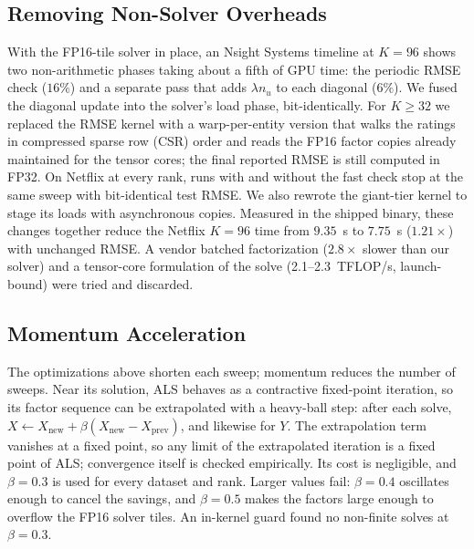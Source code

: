 \subsection{Removing Non-Solver Overheads}
\label{ssec:nonsolver}

With the FP16-tile solver in place, an Nsight Systems timeline at $K=96$ shows two non-arithmetic phases taking about a fifth of GPU time: the periodic RMSE check ($16\%$) and a separate pass that adds $\lambda n_u$ to each diagonal ($6\%$). We fused the diagonal update into the solver's load phase, bit-identically. For $K \ge 32$ we replaced the RMSE kernel with a warp-per-entity version that walks the ratings in compressed sparse row (CSR) order and reads the FP16 factor copies already maintained for the tensor cores; the final reported RMSE is still computed in FP32. On Netflix at every rank, runs with and without the fast check stop at the same sweep with bit-identical test RMSE. We also rewrote the giant-tier kernel to stage its loads with asynchronous copies. Measured in the shipped binary, these changes together reduce the Netflix $K=96$ time from $9.35$~s to $7.75$~s ($1.21\times$) with unchanged RMSE. A vendor batched factorization ($2.8\times$ slower than our solver) and a tensor-core formulation of the solve (2.1--2.3~TFLOP/s, launch-bound) were tried and discarded.

\subsection{Momentum Acceleration}
\label{ssec:momentum}

The optimizations above shorten each sweep; momentum reduces the number of sweeps. Near its solution, ALS behaves as a contractive fixed-point iteration, so its factor sequence can be extrapolated with a heavy-ball step: after each solve, $X \leftarrow X_{\text{new}} + \beta (X_{\text{new}} - X_{\text{prev}})$, and likewise for $Y$. The extrapolation term vanishes at a fixed point, so any limit of the extrapolated iteration is a fixed point of ALS; convergence itself is checked empirically. Its cost is negligible, and $\beta = 0.3$ is used for every dataset and rank. Larger values fail: $\beta = 0.4$ oscillates enough to cancel the savings, and $\beta = 0.5$ makes the factors large enough to overflow the FP16 solver tiles. An in-kernel guard found no non-finite solves at $\beta = 0.3$.

